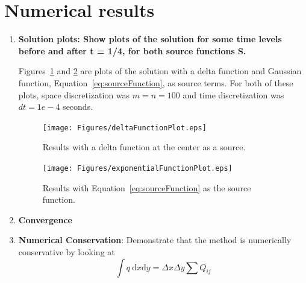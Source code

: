 

\section{Numerical results} 

\label{sec:numerical_results}
\begin{enumerate}
	\item \textbf{Solution plots: Show plots of the solution for some time levels before and after t = 1/4, for \textbf{both} source functions S.} 
	
	{\color{blue} Figures~\ref{fig:Figures_deltaFunctionPlot} and \ref{fig:Figures_exponentialFunctionPlot} are plots of the solution with a delta function and Gaussian function, Equation~\eqref{eq:sourceFunction}, as source terms. For both of these plots, space discretization was $m=n=100$ and time discretization was $dt=1e-4$ seconds.} 
	\begin{figure}
		[htbp] \centering 
		\texttt{[image: Figures/deltaFunctionPlot.eps]} \caption{Results with a delta function at the center as a source.} \label{fig:Figures_deltaFunctionPlot} 
	\end{figure}
	
	\begin{figure}
		[htbp] \centering 
		\texttt{[image: Figures/exponentialFunctionPlot.eps]} \caption{Results with Equation~\eqref{eq:sourceFunction} as the source function.} \label{fig:Figures_exponentialFunctionPlot} 
	\end{figure}
	
	
	\item \textbf{Convergence }
	\item \textbf{Numerical Conservation}: Demonstrate that the method is numerically conservative by looking at 
	\begin{equation}
		\int q \mathrm{~d}x \mathrm{d}y = \Delta x \Delta y \sum Q_{ij} \label{eq:numConservation} 
	\end{equation}
	

\end{enumerate}
